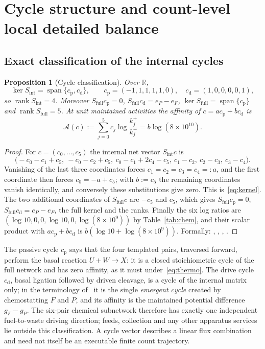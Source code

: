 \documentclass[11pt,a4paper]{article}
\theoremstyle{plain}
\newtheorem{proposition}[theorem]{Proposition}
\theoremstyle{definition}
\theoremstyle{remark}
\newcommand{\R}{\mathbb R}
\newcommand{\Sint}{S_{\mathrm{int}}}
\newcommand{\Sfull}{S_{\mathrm{full}}}
\newcommand{\cP}{c_{\mathrm p}}
\newcommand{\cD}{c_{\mathrm d}}
\newcommand{\Aff}{\mathcal A}
\begin{document}
\section{Cycle structure and count-level local detailed balance}\label{sec:cycles}

\subsection{Exact classification of the internal cycles}
\begin{proposition}[Cycle classification]\label{prop:cycles}
Over $\R$,
\begin{equation}\label{eq:kernel}
 \ker\Sint=\operatorname{span}\{\cP,\cD\},\qquad \cP=(-1,1,1,1,1,0),\quad \cD=(1,0,0,0,0,1),
\end{equation}
so $\operatorname{rank}\Sint=4$. Moreover $\Sfull\cP=0$, $\Sfull\cD=e_P-e_F$, $\ker\Sfull=\operatorname{span}\{\cP\}$ and $\operatorname{rank}\Sfull=5$. At unit maintained activities the affinity of $c=a\cP+b\cD$ is
\begin{equation}\label{eq:affinity}
 \Aff(c):=\sum_{j=0}^5c_j\log\frac{k_j^+}{k_j^-}=b\log(8\times10^{10}).
\end{equation}
\end{proposition}
\begin{proof}
For $c=(c_0,\dots,c_5)$ the internal net vector $\Sint c$ is
\[
 \big(-c_0-c_1+c_5,\ -c_0-c_2+c_5,\ c_0-c_1+2c_4-c_5,\ c_1-c_2,\ c_2-c_3,\ c_3-c_4\big).
\]
Vanishing of the last three coordinates forces $c_1=c_2=c_3=c_4=:a$, and the first coordinate then forces $c_0=-a+c_5$; with $b:=c_5$ the remaining coordinates vanish identically, and conversely these substitutions give zero. This is~\eqref{eq:kernel}. The two additional coordinates of $\Sfull c$ are $-c_5$ and $c_5$, which gives $\Sfull\cP=0$, $\Sfull\cD=e_P-e_F$, the full kernel and the ranks. Finally the six log ratios are $(\log10,0,0,\log10,0,\log(8\times10^9))$ by Table~\ref{tab:chem}, and their scalar product with $a\cP+b\cD$ is $b(\log10+\log(8\times10^9))$. Formally: , , , .
\end{proof}

The passive cycle $\cP$ says that the four templated pairs, traversed forward, perform the basal reaction $U+W\to X$: it is a closed stoichiometric cycle of the full network and has zero affinity, as it must under~\eqref{eq:thermo}. The drive cycle $\cD$, basal ligation followed by driven cleavage, is a cycle of the internal matrix only; in the terminology of~\citep{polettini2014} it is the single \emph{emergent cycle} created by chemostatting $F$ and $P$, and its affinity is the maintained potential difference $g_F-g_P$. The six-pair chemical subnetwork therefore has exactly one independent fuel-to-waste driving direction; feeds, collection and any other apparatus services lie outside this classification. A cycle vector describes a linear flux combination and need not itself be an executable finite count trajectory.
\end{document}
